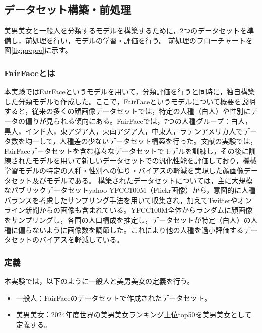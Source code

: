 \documentclass[a4paper,11pt,titlepage]{jsarticle}
\begin{document}
\subsection{データセット構築・前処理}
美男美女と一般人を分類するモデルを構築するために，2つのデータセットを準備し，前処理を行い，モデルの学習・評価を行う。
前処理のフローチャートを図\ref{fig:prepro}に示す。


\subsubsection{FairFaceとは}
本実験ではFairFaceというモデルを用いて，分類評価を行うと同時に，独自構築した分類モデルも作成した。ここで，FairFaceというモデルについて概要を説明すると，従来の多くの顔画像データセットでは，特定の人種（白人）や性別にデータの偏りが見られる傾向にある。FairFaceでは，7つの人種グループ：白人，黒人，インド人，東アジア人，東南アジア人，中東人，ラテンアメリカ人でデータ数を均一して，人種差の少ないデータセット構築を行った\cite{karkkainenFairFace}。文献\cite{karkkainenFairFace}の実験では，FairFaceデータセットを含む様々なデータセットでモデルを訓練し，その後に訓練されたモデルを用いて新しいデータセットでの汎化性能を評価しており，機械学習モデルの特定の人種・性別への偏り・バイアスの軽減を実現した顔画像データセット及びモデルである。
構築されたデータセットについては，主に大規模なパブリックデータセットyahoo YFCC100M（Flickr画像）から，意図的に人種バランスを考慮したサンプリング手法を用いて収集され，加えてTwitterやオンライン新聞からの画像も含まれている。YFCC100M全体からランダムに顔画像をサンプリングし，各国の人口構成を推定し，データセットが特定（白人）の人種に偏らないように画像数を調節した。これにより他の人種を過小評価するデータセットのバイアスを軽減している。




\subsubsection{定義}
本実験では，以下のように一般人と美男美女の定義を行う。
\begin{itemize}
    \item 一般人：FairFaceのデータセットで作成されたデータセット。
    \item 美男美女：2024年度世界の美男美女ランキング上位top50を美男美女として定義する。
\end{itemize}
\end{document}
